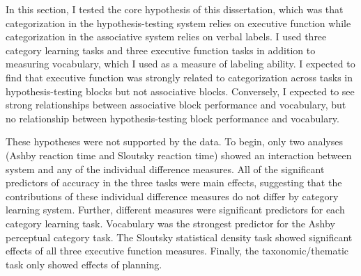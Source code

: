 \documentclass[../dissertation.tex]{subfiles}
\begin{document}
	In this section, I tested the core hypothesis of this dissertation, which was that categorization in the hypothesis-testing system relies on executive function while categorization in the associative system relies on verbal labels. I used three category learning tasks and three executive function tasks in addition to measuring vocabulary, which I used as a measure of labeling ability. I expected to find that executive function was strongly related to categorization across tasks in hypothesis-testing blocks but not associative blocks. Conversely, I expected to see strong relationships between associative block performance and vocabulary, but no relationship between hypothesis-testing block performance and vocabulary. \par 
	These hypotheses were not supported by the data. To begin, only two analyses (Ashby reaction time and Sloutsky reaction time) showed an interaction between system and any of the individual difference measures. All of the significant predictors of accuracy in the three tasks were main effects, suggesting that the contributions of these individual difference measures do not differ by category learning system. Further, different measures were significant predictors for each category learning task. Vocabulary was the strongest predictor for the Ashby perceptual category task. The Sloutsky statistical density task showed significant effects of all three executive function measures. Finally, the taxonomic/thematic task only showed effects of planning. \par
	
\end{document}
